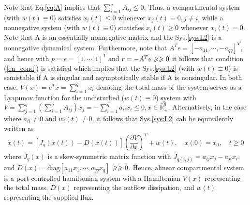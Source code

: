 \documentclass{paper}
\begin{document}
Note that Eq.\ref{eq:A} implies that $\sum_{i=1}^{q}A_{ij}\leqslant 0$. Thus, a compartmental system (with
$w(t)\equiv 0$) satisfies $\dot{x}_i(t)\leqslant 0$ whenever $x_j(t)=0,j\neq i$, while a nonnegative system 
(with $w(t)\equiv 0$) statisfies $\dot{x}_i(t)\geqslant 0$ whenever $x_i(t)=0$. Note that A is an essentially
nonnegative matrix and the Sys.\ref{sys:L2} is a nonnegative dynamical system. Furthermore, note that 
$A^Te=[-a_{11},\cdots,-a_{qq}]^T$, and hence with $p=e=[1,\cdots,1]^T$ and $r=-A^Te\geqslant\geqslant 0$ it follows that 
condition (\ref{en_cond}) is satisfied which implies that the Sys.\ref{sys:L2} (with $w(t)\equiv 0$) is semistable
if A is singular and asymptotically stable if A is nonsingular. In both case, $V(x)=e^Tx=\sum_{i=1}^{q}x_i$ denoting
the total mass of the system serves as a Lyapunov function for the undisturbed ($w(t)\equiv 0$)  system with
$\dot{V}=\sum_{j=1}^{q}(\sum_{i=1}^{q}A_{ij})x_j=-\sum_{i=1}^{q}a_{ii}x_i\leqslant 0, x\in \overline{\mathbb{R}}_{+}^{q}$.
Alternatively, in the case where $a_{ii}\neq 0$ and $w_i(t)\neq 0$, it follows that Sys.\ref{sys:L2} cab be equivalently
written as 
\begin{equation}
\dot{x}(t)=[J_q(x(t))-D(x(t))]\left(\frac{\partial V}{\partial x}\right)^T+w(t),\quad x(0)=x_0,\quad t\geqslant 0
\end{equation}
where $J_q(x)$ is a skew-symmetric matrix function with $J_{q(i,j)}=a_{ij}x_j-a_{ji}x_i$, and $D(x)=\text{diag}[a_{11}x_1,
\cdots,a_{qq}x_q]$ $\geqslant\geqslant 0$. Hence, alinear compartmental system is a port-controlled hamiltonian system with a Hamiltonian
$V(x)$ representing the total mass, $D(x)$ representing the outflow dissipation, and $w(t)$ representing the supplied flux. 
\end{document}
